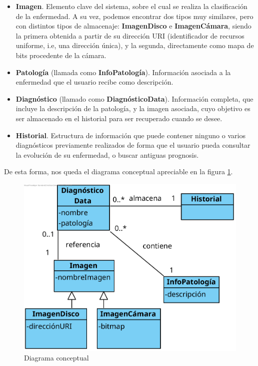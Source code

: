 \begin{itemize}
	\item \textbf{Imagen}. Elemento clave del sistema, sobre el cual se realiza la clasificación de la enfermedad.  A su vez, podemos encontrar dos tipos muy similares, pero con distintos tipos de almacenaje: \textbf{ImagenDisco} e \textbf{ImagenCámara}, siendo la primera obtenida a partir de su dirección URI (identificador de recursos uniforme, i.e, una dirección única), y la segunda, directamente como mapa de bits procedente de la cámara.
	\item  \textbf{Patología} (llamada como \textbf{InfoPatología}). Información asociada a la enfermedad que el usuario recibe como descripción.
	\item \textbf{Diagnóstico} (llamado como \textbf{DiagnósticoData}). Información completa, que incluye la descripción de la patología, y la imagen asociada, cuyo objetivo es ser almacenado en el historial para ser recuperado cuando se desee.
	\item \textbf{Historial}. Estructura de información que puede contener ninguno o varios diagnósticos previamente realizados de forma que el usuario pueda consultar la evolución de su enfermedad, o buscar antiguas prognosis.
\end{itemize}

De esta forma, nos queda el diagrama conceptual apreciable en la figura \ref{fig:conceptual}.

\begin{figure}[H]
	\centering
	\includegraphics[scale = 1.2]{imagenes/MapaConceptual.png}
	\caption{Diagrama conceptual}
	\label{fig:conceptual}
\end{figure}


